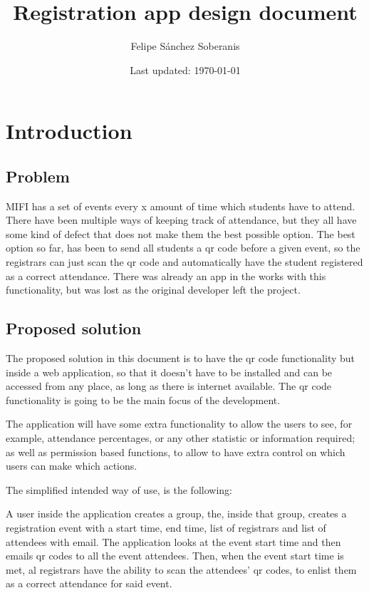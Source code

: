 \documentclass[12pt, letterpaper]{article}
\title{Registration app design document}
\author{Felipe Sánchez Soberanis}
\date{Last updated: \today}
\newcommand{\newpagesection}[1]{\newpage \section{#1}}
\begin{document}
\maketitle

\tableofcontents

\newpagesection{Introduction}

\subsection{Problem}

MIFI has a set of events every x amount of time which students have to attend. There have been multiple ways of keeping track of attendance, but they all have some kind of defect that does not make them the best possible option. The best option so far, has been to send all students a qr code before a given event, so the registrars can just scan the qr code and automatically have the student registered as a correct attendance. There was already an app in the works with this functionality, but was lost as the original developer left the project.

\subsection{Proposed solution}

The proposed solution in this document is to have the qr code functionality but inside a web application, so that it doesn't have to be installed and can be accessed from any place, as long as there is internet available. The qr code functionality is going to be the main focus of the development.

The application will have some extra functionality to allow the users to see, for example, attendance percentages, or any other statistic or information required; as well as permission based functions, to allow to have extra control on which users can make which actions.

The simplified intended way of use, is the following:

A user inside the application creates a group, the, inside that group, creates a registration event with a start time, end time, list of registrars and list of attendees with email. The application looks at the event start time and then emails qr codes to all the event attendees. Then, when the event start time is met, al registrars have the ability to scan the attendees' qr codes, to enlist them as a correct attendance for said event.
\end{document}
